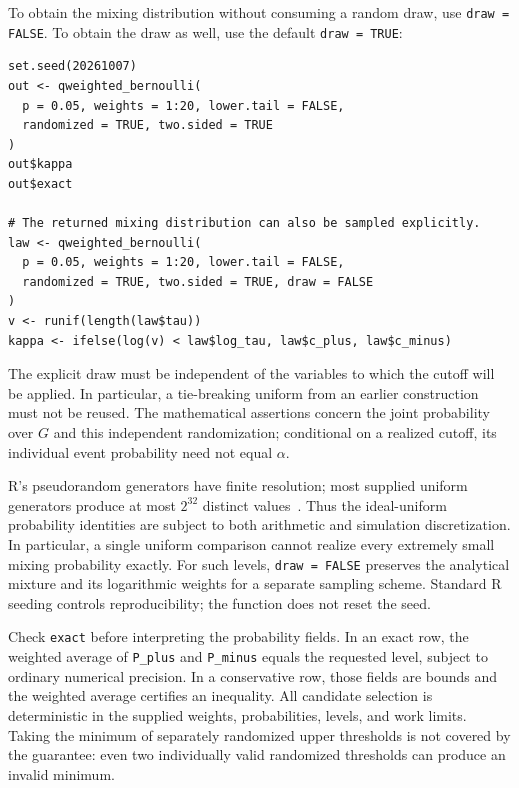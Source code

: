 \documentclass[11pt,letterpaper]{article}
\begin{document}
To obtain the mixing distribution without consuming a random draw, use
\texttt{draw = FALSE}. To obtain the draw as well, use the default
\texttt{draw = TRUE}:
\begin{lstlisting}
set.seed(20261007)
out <- qweighted_bernoulli(
  p = 0.05, weights = 1:20, lower.tail = FALSE,
  randomized = TRUE, two.sided = TRUE
)
out$kappa
out$exact

# The returned mixing distribution can also be sampled explicitly.
law <- qweighted_bernoulli(
  p = 0.05, weights = 1:20, lower.tail = FALSE,
  randomized = TRUE, two.sided = TRUE, draw = FALSE
)
v <- runif(length(law$tau))
kappa <- ifelse(log(v) < law$log_tau, law$c_plus, law$c_minus)
\end{lstlisting}
The explicit draw must be independent of the variables to which the cutoff
will be applied. In particular, a tie-breaking uniform from an earlier
construction must not be reused. The mathematical assertions concern the
joint probability over $G$ and this independent randomization; conditional
on a realized cutoff, its individual event probability need not equal
$\alpha$.

R's pseudorandom generators have finite resolution; most supplied uniform
generators produce at most $2^{32}$ distinct values~\cite{rrng}. Thus the
ideal-uniform probability identities are subject to both arithmetic and
simulation discretization. In particular, a single uniform comparison
cannot realize every extremely small mixing probability exactly. For such
levels, \texttt{draw = FALSE} preserves the analytical mixture and its
logarithmic weights for a separate sampling scheme. Standard R seeding
controls reproducibility; the function does not reset the seed.

Check \texttt{exact} before interpreting the probability fields. In an exact
row, the weighted average of \texttt{P\_plus} and \texttt{P\_minus} equals
the requested level, subject to ordinary numerical precision. In a
conservative row, those fields are bounds and the weighted average certifies
an inequality. All candidate selection is deterministic in the supplied
weights, probabilities, levels, and work limits. Taking the minimum of
separately randomized upper thresholds is not covered by the guarantee:
even two individually valid randomized thresholds can produce an invalid
minimum.
\end{document}

